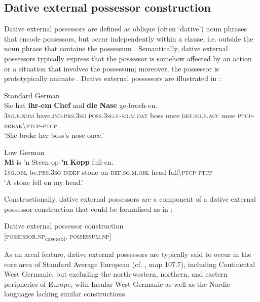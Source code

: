 \documentclass[output=paper]{langsci/langscibook}
\begin{document}
 
 \subsection{Dative external possessor construction}\label{sec:hoeder:4.6}

Dative external possessors are defined as oblique (often ‘dative’) noun phrases that encode possessors, but occur independently within a clause, i.e. outside the noun phrase that contains the possessum \citep{Haspelmath.1999, Haspelmath.2001, Konig.2001}. Semantically, dative external possessors typically express that the possessor is somehow affected by an action or a situation that involves the possessum; moreover, the possessor is prototypically animate \citep[112–114]{Haspelmath.1999}. Dative external possessors are illustrated in :

 
\ea\label{ex:hoeder:20}
	\ea\label{ex:hoeder:20a}
	Standard German\\
	\gll Sie hat \textbf{ihr-em} \textbf{Chef} mal \textbf{die} \textbf{Nase} ge-broch-en.\\
     3\textsc{sg.f.nom} have.\textsc{ind.prs.3sg} \textsc{poss.3sg.f-sg.m.dat} boss once \textsc{def.sg.f.acc} nose \textsc{ptcp-break{\textbackslash}ptcp-ptcp}\\
	\glt `She broke her boss’s nose once.'

	\ex\label{ex:hoeder:20b}
	Low German\\
	\gll \textbf{Mi} is ’n Steen op-\textbf{’n} \textbf{Kopp} full-en.\\
     1\textsc{sg.obl} be.\textsc{prs.3sg} \textsc{indef} stone on-\textsc{def.sg.m.obl} head fall{\textbackslash}\textsc{ptcp-ptcp}\\
	\glt `A stone fell on my head.'
\z
\z

Constructionally, dative external possessors are a component of a dative external possessor construction that could be formalised as in :

\ea
\label{ex:hoeder:21}
	Dative external possessor construction\\
     {[}\textsc{possessor.np}\textsubscript{case:obl}, \textsc{possessum.np}{]}
  \z
  
  
As an areal feature, dative external possessors are typically said to occur in the core area of Standard Average European (cf. \citealt[1498]{Haspelmath.2001}, map 107.7), including Continental West Germanic, but excluding the north-western, northern, and eastern peripheries of Europe, with Insular West Germanic as well as the Nordic languages lacking similar constructions.
\end{document}
